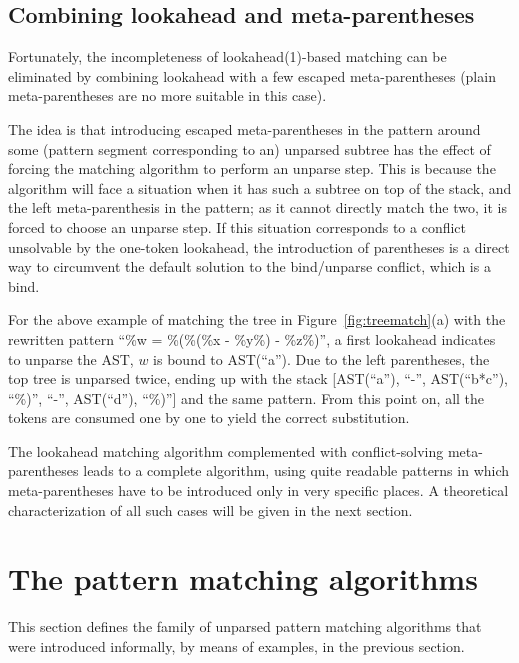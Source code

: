 \documentclass{sigplanconf}
\begin{document}


\subsection{Combining lookahead and meta-parentheses}
Fortunately, the incompleteness of lookahead(1)-based matching can be
eliminated by combining lookahead with a few escaped meta-parentheses
(plain meta-parentheses are no more suitable in this case). 

The idea is that introducing escaped meta-parentheses in the pattern
around some (pattern segment corresponding to an) unparsed subtree has
the effect of forcing the matching algorithm to perform an unparse
step. This is because the algorithm will face a situation when it has
such a subtree on top of the stack, and the left meta-parenthesis in
the pattern; as it cannot directly match the two, it is forced to
choose an unparse step. If this situation corresponds to a conflict
unsolvable by the one-token lookahead, the introduction of parentheses
is a direct way to circumvent the default solution to the bind/unparse
conflict, which is a bind.

For the above example of matching the tree in
Figure~\ref{fig:treematch}(a) with the rewritten pattern ``\%w =
\%(\%(\%x - \%y\%) - \%z\%)'', a first lookahead indicates to unparse
the AST, $w$ is bound to AST(``a''). Due to the left parentheses, the
top tree is unparsed twice, ending up with the stack [AST(``a''),
``-'', AST(``b*c''), ``\%)'', ``-'', AST(``d''), ``\%)''] and the same
pattern. From this point on, all the tokens are consumed one by
one to yield the correct substitution.

The lookahead matching algorithm complemented with conflict-solving
meta-parentheses leads to a complete algorithm, using quite readable
patterns in which meta-parentheses have to be introduced only in very
specific places. A theoretical characterization of all such cases will
be given in the next section.

\section{The pattern matching algorithms}
\label{algos}
This section defines the family of unparsed pattern matching
algorithms that were introduced informally, by means of examples, in
the previous section.
\end{document}
